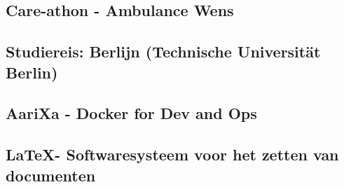 


\subsection{Care\hyp{}athon - Ambulance Wens}


\subsection{Studiereis: Berlijn (Technische Universit\"at Berlin)}


\subsection{AariXa - Docker for Dev and Ops}


\subsection{\LaTeX - Softwaresysteem voor het zetten van documenten}

